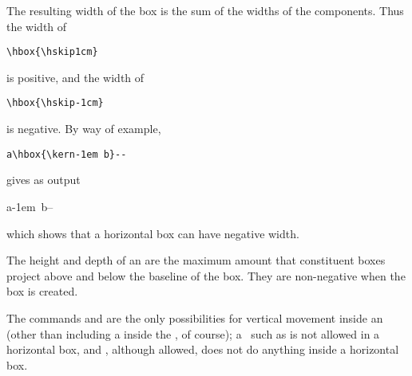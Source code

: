 \documentclass{book}
\begin{document}
The resulting width of the box is the sum of the widths
of the components. Thus the width of
\begin{verbatim}
\hbox{\hskip1cm}
\end{verbatim}
is positive, and the width of
\begin{verbatim}
\hbox{\hskip-1cm}
\end{verbatim}
is negative. By way of example,
\begin{disp}\verb>a\hbox{\kern-1em b}-->\end{disp}
gives as output
\begin{disp}\leavevmode\hphantom{b}a\hbox{\kern-1em b}--\end{disp}
which shows that a horizontal box can have negative
width.

The height and depth of an  are the
maximum amount that constituent boxes project above and
below the baseline of the box. They are non-negative when the
box is created.

The commands  and  are the only possibilities
for vertical movement inside an  (other than
including a  inside the , of course);
a~ \ldash such as  \rdash
is not allowed in a horizontal box, and
, although allowed,
does not do anything inside a horizontal box.
\end{document}

